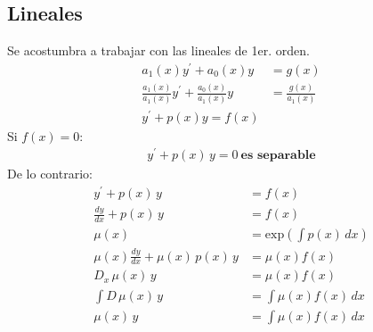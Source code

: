 \documentclass[letterpaper, 12pt]{article}
\begin{document}
\begin{justify}
        \subsection*{Lineales}
        \justify
        Se acostumbra a trabajar con las lineales de 1er. orden.
        {\large\begin{equation*}
            \begin{aligned}
                a_1(x)y^{\prime}+a_0(x)y&=g(x)\\[5pt]
                \frac{a_1(x)}{a_1(x)}y^{\prime}+\frac{a_0(x)}{a_1(x)}y&=\frac{g(x)}{a_1(x)}\\[5pt]
                y^{\prime}+p(x)y = f(x)
            \end{aligned}
        \end{equation*}}
        Si \(f(x)=0\):
        {\large\begin{equation*}
            \begin{aligned}
                y^{\prime}+p(x)\, y=0\:\textbf{es separable}
            \end{aligned}
        \end{equation*}}
        De lo contrario:
        {\large\begin{equation*}
            \begin{aligned}
                y^{\prime}+p(x)\, y&=f(x)\\[5pt]
                \frac{dy}{dx}+p(x)\, y&=f(x)\\[5pt]
                \mu(x)&=\text{exp}\left(\int p(x)\, dx\right)\\[5pt]
                \mu(x)\frac{dy}{dx}+\mu(x)\, p(x)\, y&=\mu(x)f(x)\\[5pt]
                D_x\,\mu(x)\, y&=\mu(x)f(x)\\[5pt]
                \int D\, \mu(x)\, y&=\int \mu(x)f(x)\, dx\\[5pt]
                \mu(x)\, y&=\int \mu(x)f(x)\, dx
            \end{aligned}
        \end{equation*}}

\end{justify}
\end{document}
